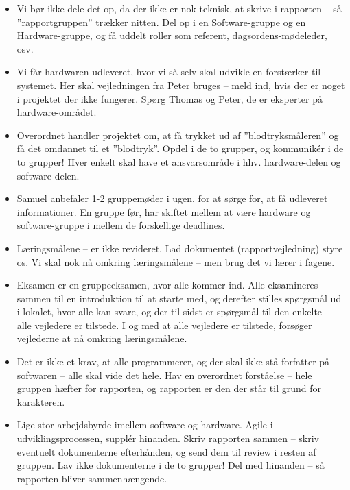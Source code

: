 \documentclass[a4paper,11pt,oneside]{memoir}
\begin{document}
\begin{itemize}
\item Vi bør ikke dele det op, da der ikke er nok teknisk, at skrive i rapporten – så ”rapportgruppen” trækker nitten. Del op i en Software-gruppe og en Hardware-gruppe, og få uddelt roller som referent, dagsordens-mødeleder, osv. 
\item Vi får hardwaren udleveret, hvor vi så selv skal udvikle en forstærker til systemet. Her skal vejledningen fra Peter bruges – meld ind, hvis der er noget i projektet der ikke fungerer. Spørg Thomas og Peter, de er eksperter på hardware-området.
\item Overordnet handler projektet om, at få trykket ud af ”blodtryksmåleren” og få det omdannet til et ”blodtryk”. Opdel i de to grupper, og kommunikér i de to grupper! Hver enkelt skal have et ansvarsområde i hhv. hardware-delen og software-delen. 

\item Samuel anbefaler 1-2 gruppemøder i ugen, for at sørge for, at få udleveret informationer. En gruppe før, har skiftet mellem at være hardware og software-gruppe i mellem de forskellige deadlines. 

\item Læringsmålene – er ikke revideret. Lad dokumentet (rapportvejledning) styre os. Vi skal nok nå omkring læringsmålene – men brug det vi lærer i fagene.  

\item Eksamen er en gruppeeksamen, hvor alle kommer ind. Alle eksamineres sammen til en introduktion til at starte med, og derefter stilles spørgsmål ud i lokalet, hvor alle kan svare, og der til sidst er spørgsmål til den enkelte – alle vejledere er tilstede. I og med at alle vejledere er tilstede, forsøger vejlederne at nå omkring læringsmålene. 

\item Det er ikke et krav, at alle programmerer, og der skal ikke stå forfatter på softwaren – alle skal vide det hele. Hav en overordnet forståelse – hele gruppen hæfter for rapporten, og rapporten er den der står til grund for karakteren.  

\item Lige stor arbejdsbyrde imellem software og hardware. Agile i udviklingsprocessen, supplér hinanden. Skriv rapporten sammen – skriv eventuelt dokumenterne efterhånden, og send dem til review i resten af gruppen. Lav ikke dokumenterne i de to grupper! Del med hinanden – så rapporten bliver sammenhængende. 


\end{itemize}
\end{document}
